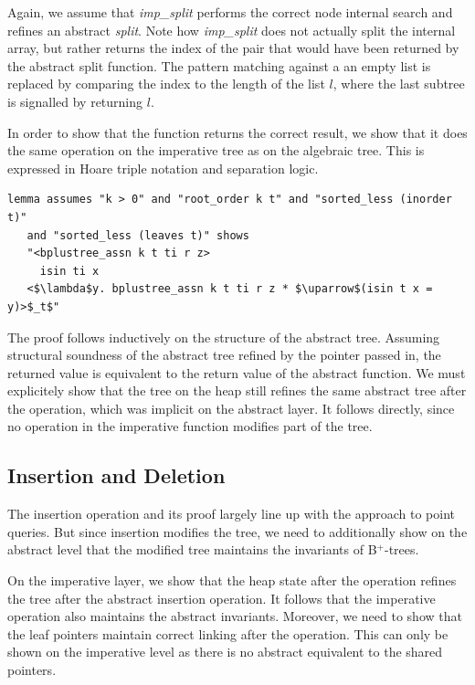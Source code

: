 \documentclass[a4paper,UKenglish,cleveref, autoref, thm-restate]{lipics-v2021}
\newcommand{\btrees}{B$^+$-trees}
\begin{document}
Again, we assume that \emph{imp\_split} performs the correct node internal search
and refines an abstract \emph{split}.
Note how \emph{imp\_split} does not actually split
the internal array, but rather returns the index of the pair
that would have been returned by the abstract split function.
The pattern matching against a an empty list
is replaced by comparing the index to the length of the list $l$,
where the last subtree is signalled by returning $l$.

In order to show that the function returns the correct result,
we show that it does the same operation on the imperative tree
as on the algebraic tree.
This is expressed in Hoare triple notation and separation logic.

\begin{lstlisting}[mathescape=true, language=Isabelle,label=lst:isin-refines]
lemma assumes "k > 0" and "root_order k t" and "sorted_less (inorder t)"
   and "sorted_less (leaves t)" shows
   "<bplustree_assn k t ti r z>
     isin ti x
   <$\lambda$y. bplustree_assn k t ti r z * $\uparrow$(isin t x = y)>$_t$"
\end{lstlisting}

The proof follows inductively on the structure of the abstract tree.
Assuming structural soundness of the abstract tree refined by the pointer passed in,
the returned value is equivalent to the return value of the abstract function.
We must explicitely show that the tree on the heap
still refines the same abstract tree after the operation,
which was implicit on the abstract layer.
It follows directly, since no operation in the imperative
function modifies part of the tree.

\subsection{Insertion and Deletion}
\label{sec:insert_delete}

The insertion operation and its proof largely line up with the approach to point queries.
But since insertion modifies the tree,
we need to additionally show on the abstract level that the modified tree
maintains the invariants of \btrees.

On the imperative layer, we show that the heap state
after the operation refines the tree
after the abstract insertion operation.
It follows that the imperative operation
also maintains the abstract invariants.
Moreover, we need to show that the leaf pointers
maintain correct linking after the operation.
This can only be shown on the imperative level as there is no abstract equivalent
to the shared pointers.
\end{document}

